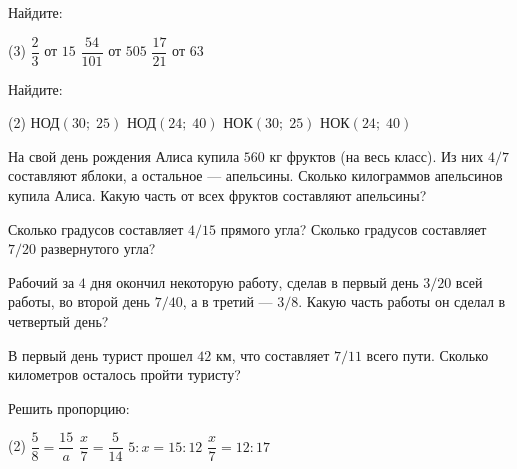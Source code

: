 %
%

\begin{class}[number=1]
	\begin{listofex}
	\item Найдите:
	\begin{tasks}(3)
		\task \( \dfrac{2}{3} \) от \( 15 \)
		\task \( \dfrac{54}{101} \) от \( 505 \)
		\task \( \dfrac{17}{21} \) от \( 63 \)
	\end{tasks}
	\item Найдите:
	\begin{tasks}(2)
		\task НОД\( (30;\;25) \)
		\task НОД\( (24;\;40) \)
		\task НОК\( (30;\;25) \)
		\task НОК\( (24;\;40) \)
	\end{tasks}
	\item На свой день рождения Алиса купила \( 560 \) кг фруктов (на весь класс). Из них \( 4/7 \) составляют яблоки, а остальное --- апельсины. Сколько килограммов апельсинов купила Алиса. Какую часть от всех фруктов составляют апельсины?
	\item Сколько градусов составляет \( 4/15 \) прямого угла? Сколько градусов составляет \( 7/20 \) развернутого угла?
	\item Рабочий за \( 4 \) дня окончил некоторую работу, сделав в первый день \( 3/20 \) всей работы, во второй день \( 7/40 \), а в третий --- \( 3/8 \). Какую часть работы он сделал в четвертый день?
	\item В первый день турист прошел \( 42 \) км, что составляет \( 7/11 \) всего пути. Сколько километров осталось пройти туристу?
	\item Решить пропорцию:
	\begin{tasks}(2)
		\task \( \dfrac{5}{8}=\dfrac{15}{a} \)
		\task \( \dfrac{x}{7}=\dfrac{5}{14} \)
		\task \( 5:x=15:12 \)
		\task \( \dfrac{x}{7}=12:17 \)
	\end{tasks}
	\end{listofex}
\end{class}

